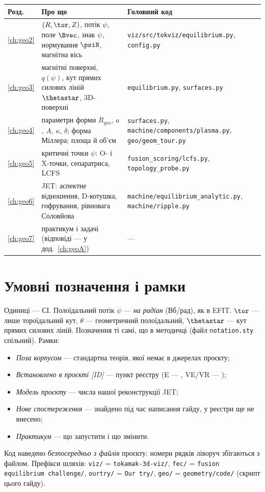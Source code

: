 \begin{center}\small
\begin{tabularx}{\textwidth}{@{}l>{\raggedright\arraybackslash}X>{\raggedright\arraybackslash}X@{}}
\toprule
Розд. & Про що & Головний код \\
\midrule
\ref{ch:geo2} & $(R,\tor,Z)$, потік $\psi$, поле $\Bvec$, знак $\psi$, нормування $\psiN$, магнітна вісь & \texttt{viz/src/tokviz/equilibrium.py}, \texttt{config.py} \\
\ref{ch:geo3} & магнітні поверхні, $q(\psi)$, кут прямих силових ліній $\thetastar$, 3D-поверхні & \texttt{equilibrium.py}, \texttt{surfaces.py} \\
\ref{ch:geo4} & параметри форми $R_{\mathrm{geo}}$, $a$, $A$, $\kappa$, $\delta$; форма Міллера; площа й об'єм & \texttt{surfaces.py}, \texttt{machine/components/plasma.py}, \texttt{geo/geom\_tour.py} \\
\ref{ch:geo5} & критичні точки $\psi$: O- і X-точки, сепаратриса, LCFS & \texttt{fusion\_scoring/lcfs.py}, \texttt{topology\_probe.py} \\
\ref{ch:geo6} & JET: аспектне відношення, D-котушка, гофрування, рівновага Соловйова & \texttt{machine/equilibrium\_analytic.py}, \texttt{machine/ripple.py} \\
\ref{ch:geo7} & практикум і задачі (відповіді --- у дод.~\ref{ch:geoA}) & --- \\
\bottomrule
\end{tabularx}
\end{center}

\section{Умовні позначення і рамки}\label{sec:geo1-conv}

Одиниці --- СІ. Полоїдальний потік $\psi$ --- \emph{на радіан} (Вб/рад), як в EFIT. $\tor$ --- лише тороїдальний кут, $\theta$ --- геометричний полоїдальний, $\thetastar$ --- кут прямих силових ліній. Позначення ті самі, що в методичці (файл \texttt{notation.sty} спільний). Рамки:
\begin{itemize}
\item \emph{Поза корпусом} --- стандартна теорія, якої немає в джерелах проєкту;
\item \emph{Встановлено в проєкті [ID]} --- пункт реєстру (E --- \cite{RegEst}, VE/VR --- \cite{RegViz});
\item \emph{Модель проєкту} --- числа нашої реконструкції JET;
\item \emph{Нове спостереження} --- знайдено під час написання гайду, у реєстри ще не внесено;
\item \emph{Практикум} --- що запустити і що змінити.
\end{itemize}
Код наведено \emph{безпосередньо з файлів} проєкту: номери рядків ліворуч збігаються з файлом. Префікси шляхів: \texttt{viz/} = \texttt{tokamak-3d-viz/}, \texttt{fec/} = \texttt{fusion equilibrium challenge/}, \texttt{ourtry/} = \texttt{Our try/}, \texttt{geo/} = \texttt{geometry/code/} (скрипт цього гайду).

